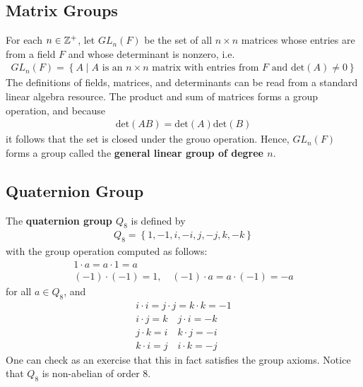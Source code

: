 \documentclass{memoir}
\begin{document}
\subsection{Matrix Groups}
\label{sub:matrix_groups}

For each \(n \in \mathbb{Z}^{+}\), let \(GL_n(F)\) be the set of all \(n\times n\) matrices whose entries are from a field \(F\) and whose determinant is nonzero, i.e.
\begin{align*}
	GL_n(F) = \left\{A \mid A \text{ is an \(n\times n\) matrix with entries from \(F\) and } \textrm{det}(A) \neq 0 \right\} 
\end{align*}
The definitions of fields, matrices, and determinants can be read from a standard linear algebra resource. The product and sum of matrices forms a group operation, and because
\begin{align*}
	\textrm{det}(AB) = \textrm{det}(A) \textrm{det}(B)
\end{align*}
it follows that the set is closed under the grouo operation. Hence, \(GL_n(F)\) forms a group called the \textbf{general linear group of degree \(n\)}.

\subsection{Quaternion Group}
\label{sub:quaternion_group}

The \textbf{quaternion group \(Q_8\)} is defined by
\begin{align*}
	Q_8 = \left\{ 1,-1,i,-i,j,-j,k,-k \right\} 
\end{align*}
with the group operation computed as follows:
\begin{align*}
	1\cdot a = a\cdot 1 = a\\
	(-1) \cdot (-1) = 1, \quad (-1)\cdot a = a \cdot (-1) = -a
\end{align*}
for all \(a \in Q_8\), and
\begin{align*}
	i\cdot i = j\cdot j = k\cdot k = -1\\
	i\cdot j = k \quad j\cdot i = -k\\
	j\cdot k = i \quad k\cdot j = -i\\
	k\cdot i = j \quad i \cdot k = -j
\end{align*}
One can check as an exercise that this in fact satisfies the group axioms. Notice that \(Q_8\) is non-abelian of order \(8\).


\end{document}
